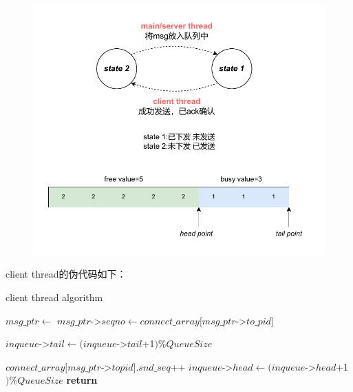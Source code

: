{    \begin{figure}[H]
        \centering
        \includegraphics[width=1.0\textwidth]{Img/send_state.drawio.pdf}
    \end{figure}

    client thread的伪代码如下：
    \begin{algorithm}
        \caption{client thread algorithm}
        \begin{algorithmic}[1] %
            \State {}
            \State $msg\_ptr \gets$ 
            \State $msg\_ptr$->$seqno \gets connect\_array[msg\_ptr$->$to\_pid]$

            \State
            \State {}
            \State {}
            \State {}
            \State $inqueue$->$tail \gets (inqueue$->$tail$+1$) \%QueueSize$
            \Else
            \EndWhile
            \EndIf

            \State
            \State $connect\_array[msg\_ptr$->$topid].snd\_seq$++
            \State $inqueue$->$head \gets (inqueue$->$head$+1$) \% QueueSize$
            \State {}
            \EndWhile
            \State \textbf{return}
            \EndProcedure
        \end{algorithmic}
    \end{algorithm}


}
